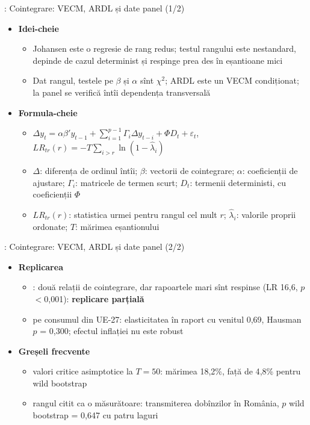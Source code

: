 \begin{frame}{: Cointegrare: VECM, ARDL și date panel (1/2)}
\itemsize{\footnotesize}
\begin{itemize}
    \item \textbf{Idei-cheie}
    \begin{itemize}
        \item Johansen este o regresie de rang redus; testul rangului este nestandard, depinde de cazul determinist și respinge prea des în eșantioane mici
        \item Dat rangul, testele pe $\beta$ și $\alpha$ sînt $\chi^2$; ARDL este un VECM condiționat; la panel se verifică întîi dependența transversală
    \end{itemize}
    \item \textbf{Formula-cheie}
    \begin{itemize}
        \item $\Delta y_t = \alpha\beta'y_{t-1} + \sum_{i=1}^{p-1}\Gamma_i\Delta y_{t-i} + \Phi D_t + \varepsilon_t$, $LR_{tr}(r) = -T\sum_{i>r}\ln(1 - \hat\lambda_i)$
        \item $\Delta$: diferența de ordinul întîi; $\beta$: vectorii de cointegrare; $\alpha$: coeficienții de ajustare; $\Gamma_i$: matricele de termen scurt; $D_t$: termenii deterministi, cu coeficienții $\Phi$
        \item $LR_{tr}(r)$: statistica urmei pentru rangul cel mult $r$; $\hat\lambda_i$: valorile proprii ordonate; $T$: mărimea eșantionului
    \end{itemize}
\end{itemize}
\end{frame}

\begin{frame}{: Cointegrare: VECM, ARDL și date panel (2/2)}
\itemsize{\small}
\begin{itemize}
    \item \textbf{Replicarea}
    \begin{itemize}
        \item {}: două relații de cointegrare, dar rapoartele mari sînt respinse (LR 16{,}6, $p$ $<$0{,}001): \textbf{replicare parțială}
        \item {} pe consumul din UE-27: elasticitatea în raport cu venitul 0{,}69, Hausman $p$ = 0{,}300; efectul inflației nu este robust
    \end{itemize}
    \item \textbf{Greșeli frecvente}
    \begin{itemize}
        \item valori critice asimptotice la $T = 50$: mărimea 18{,}2\%, față de 4{,}8\% pentru wild bootstrap
        \item rangul citit ca o măsurătoare: transmiterea dobînzilor în România, $p$ wild bootstrap = 0{,}647 cu patru laguri
    \end{itemize}
\end{itemize}
\end{frame}

